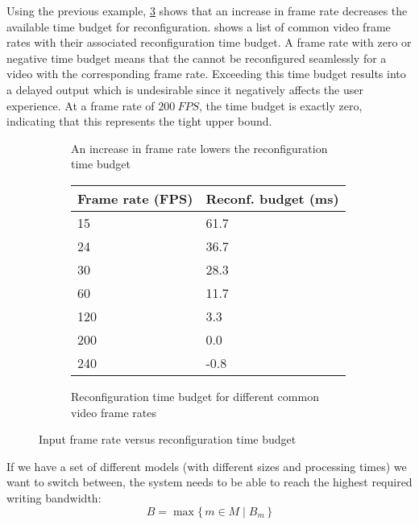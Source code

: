 Using the previous example, \cref{fig:frame_rate_versus_time_budget} shows that an increase in frame rate decreases the available time budget for reconfiguration.
 shows a list of common video frame rates with their associated reconfiguration time budget.
A frame rate with zero or negative time budget means that the \graicore{} cannot be reconfigured seamlessly for a video with the corresponding frame rate.
Exceeding this time budget results into a delayed output which is undesirable since it negatively affects the user experience.
At a frame rate of $\SI{200}{FPS}$, the time budget is exactly zero, indicating that this represents the tight upper bound.

\begin{figure}[htbp]
    \centering
    \begin{subfigure}[b]{0.48\textwidth}
        \begin{adjustbox}{width=\linewidth}
        
        \end{adjustbox}
        \caption{An increase in frame rate lowers the reconfiguration time budget}
        \label{}
    \end{subfigure}
    \hfill
    \begin{subfigure}[b]{0.48\textwidth}
        \begin{tabular}{@{}ll@{}}
        \toprule
        Frame rate (FPS) & Reconf. budget (ms) \\ \midrule
        15               & 61.7                \\
        24               & 36.7                \\
        30               & 28.3                \\
        60               & 11.7                \\
        120              & 3.3                 \\
        200              & 0.0                 \\
        240              & -0.8                \\ \bottomrule
        \end{tabular}
        \caption{Reconfiguration time budget for different common video frame rates}
        \label{tab:common_fps}
    \end{subfigure}
    \caption[]{Input frame rate versus reconfiguration time budget}
    \label{fig:frame_rate_versus_time_budget}
\end{figure}

If we have a set of different models (with different sizes and processing times) we want to switch between, the system needs to be able to reach the highest required writing bandwidth:
\begin{equation}
    B = \max\{\,m \in M \mid B_m \,\} 
\end{equation}

